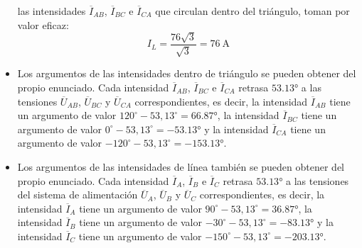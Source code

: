 \begin{itemize}
  las intensidades $\overline{I}_{AB}$, $\overline{I}_{BC}$ e
  $\overline{I}_{CA}$ que circulan dentro del triángulo, toman por
  valor eficaz:
  \[
    I_L = \dfrac{76\sqrt{3}}{\sqrt{3}}=\qty{76}{\ampere}
  \]
\item Los argumentos de las intensidades dentro de triángulo se pueden
  obtener del propio enunciado. Cada intensidad $\overline{I}_{AB}$,
  $\overline{I}_{BC}$ e $\overline{I}_{CA}$ retrasa
  $\ang{53,13}$ a las tensiones $\overline{U}_{AB}$,
  $\overline{U}_{BC}$ y $\overline{U}_{CA}$ correspondientes, es
  decir, la intensidad $\overline{I}_{AB}$ tiene un argumento de valor
  $120^\circ-53,13^\circ=\ang{66,87}$, la intensidad $\overline{I}_{BC}$
  tiene un argumento de valor $0^\circ-53,13^\circ=\ang{-53,13}$ y la
  intensidad $\overline{I}_{CA}$ tiene un argumento de valor
  $-120^\circ-53,13^\circ=\ang{-153,13}$.
\item Los argumentos de las intensidades de línea también se pueden
  obtener del propio enunciado. Cada intensidad $\overline{I}_A$,
  $\overline{I}_B$ e $\overline{I}_C$ retrasa $\ang{53,13}$ a
  las tensiones del sistema de alimentación $\overline{U}_A$,
  $\overline{U}_B$ y $\overline{U}_C$ correspondientes, es decir, la
  intensidad $\overline{I}_A$ tiene un argumento de valor
  $90^\circ-53,13^\circ=\ang{36,87}$, la intensidad $\overline{I}_B$ tiene
  un argumento de valor $-30^\circ-53,13^\circ=\ang{-83,13}$ y la
  intensidad $\overline{I}_C$ tiene un argumento de valor
  $-150^\circ-53,13^\circ=\ang{-203,13}$.
\end{itemize}

